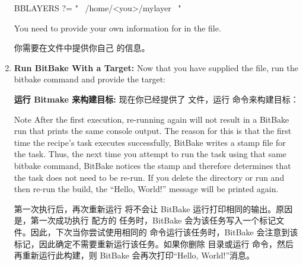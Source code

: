 \begin{enumerate}
\medskip
\begin{pyglist}
BBLAYERS ?= " \
    /home/<you>/mylayer \
"
\end{pyglist}

\medskip
You need to provide your own information for  in the file.

\medskip
你需要在文件中提供你自己 的信息。

\item \textbf{Run BitBake With a Target:} Now that you have supplied the  file, run the bitbake command and provide the target:

\medskip
\textbf{运行 Bitmake 来构建目标:} 现在你已经提供了  文件，运行  命令来构建目标：

\medskip
{}

\medskip
\begin{noteblock}{Note}%
After the first execution, re-running  again will not result in a BitBake run that prints the same console output. The reason for this is that the first time the  recipe’s  task executes successfully, BitBake writes a stamp file for the task. Thus, the next time you attempt to run the task using that same bitbake command, BitBake notices the stamp and therefore determines that the task does not need to be re-run. If you delete the  directory or run  and then re-run the build, the “Hello, World!” message will be printed again.

\medskip
第一次执行后，再次重新运行  将不会让 BitBake 运行打印相同的输出。原因是，第一次成功执行  配方的  任务时，BitBake 会为该任务写入一个标记文件。因此，下次当你尝试使用相同的  命令运行该任务时，BitBake 会注意到该标记，因此确定不需要重新运行该任务。如果你删除  目录或运行  命令，然后再重新运行此构建，则 BitBake 会再次打印“Hello, World!”消息。
\end{noteblock}
\end{enumerate}
